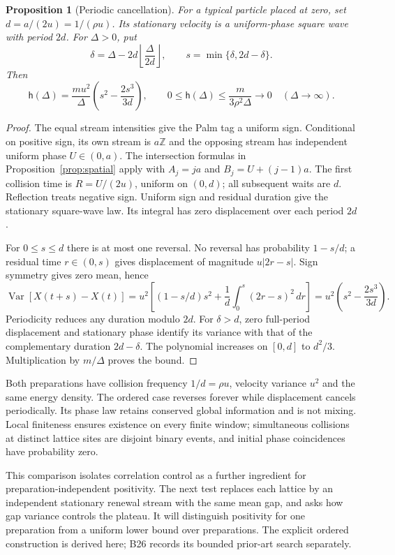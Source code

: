 \documentclass[11pt,a4paper]{article}
\newtheorem{proposition}{Proposition}
\newcommand{\Var}{\operatorname{Var}}
\begin{document}
\begin{proposition}[Periodic cancellation]\label{prop:ordered}
For a typical particle placed at zero, set $d=a/(2u)=1/(\rho u)$.
Its stationary velocity is a uniform-phase square wave with period $2d$.
For $\Delta>0$, put
\[
 \delta=\Delta-2d\left\lfloor\frac{\Delta}{2d}\right\rfloor,
 \qquad s=\min\{\delta,2d-\delta\}.
\]
Then
\[
 \mathsf h(\Delta)=\frac{mu^2}{\Delta}
 \left(s^2-\frac{2s^3}{3d}\right),\qquad
 0\le\mathsf h(\Delta)\le\frac{m}{3\rho^2\Delta}
 \longrightarrow0\quad(\Delta\to\infty).
\]
\end{proposition}
\begin{proof}
The equal stream intensities give the Palm tag a uniform sign. Conditional
on positive sign, its own stream is $a\mathbb Z$ and the opposing stream
has independent uniform phase $U\in(0,a)$. The intersection formulas in
Proposition~\ref{prop:spatial} apply with $A_j=ja$ and $B_j=U+(j-1)a$.
The first collision time is $R=U/(2u)$, uniform on $(0,d)$; all subsequent
waits are $d$. Reflection treats negative sign. Uniform sign and residual
duration give the stationary square-wave law. Its integral has zero
displacement over each period $2d$.

For $0\le s\le d$ there is at most one reversal. No reversal has probability
$1-s/d$; a residual time $r\in(0,s)$ gives displacement of magnitude
$u|2r-s|$. Sign symmetry gives zero mean, hence
\[
 \Var[X(t+s)-X(t)]
 =u^2\left[(1-s/d)s^2+\frac1d\int_0^s(2r-s)^2\,dr\right]
 =u^2\left(s^2-\frac{2s^3}{3d}\right).
\]
Periodicity reduces any duration modulo $2d$. For $\delta>d$, zero full-period
displacement and stationary phase identify its variance with that of the
complementary duration $2d-\delta$. The polynomial increases on $[0,d]$
to $d^2/3$. Multiplication by $m/\Delta$ proves the bound.
\end{proof}

Both preparations have collision frequency $1/d=\rho u$, velocity variance
$u^2$ and the same energy density. The ordered case reverses forever while
displacement cancels periodically. Its phase law retains conserved global
information and is not mixing. Local finiteness ensures existence on every
finite window; simultaneous collisions at distinct lattice sites are disjoint
binary events, and initial phase coincidences have probability zero.

This comparison isolates correlation control as a further ingredient for
preparation-independent positivity. The next test replaces each lattice by
an independent stationary renewal stream with the same mean gap, and asks
how gap variance controls the plateau. It will distinguish positivity for
one preparation from a uniform lower bound over preparations. The explicit
ordered construction is derived here; B26 records its bounded prior-art
search separately.
\end{document}
